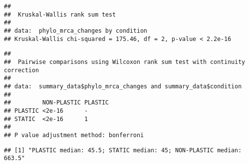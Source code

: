 \documentclass[]{book}
\newenvironment{Shaded}{\begin{snugshade}}{\end{snugshade}}
\newcommand{\DataTypeTok}[1]{\textcolor[rgb]{0.13,0.29,0.53}{#1}}
\newcommand{\KeywordTok}[1]{\textcolor[rgb]{0.13,0.29,0.53}{\textbf{#1}}}
\newcommand{\NormalTok}[1]{#1}
\newcommand{\OperatorTok}[1]{\textcolor[rgb]{0.81,0.36,0.00}{\textbf{#1}}}
\newcommand{\StringTok}[1]{\textcolor[rgb]{0.31,0.60,0.02}{#1}}
\begin{document}
\begin{verbatim}
## 
##  Kruskal-Wallis rank sum test
## 
## data:  phylo_mrca_changes by condition
## Kruskal-Wallis chi-squared = 175.46, df = 2, p-value < 2.2e-16
\end{verbatim}

\begin{Shaded}
\end{Shaded}

\begin{verbatim}
## 
##  Pairwise comparisons using Wilcoxon rank sum test with continuity correction 
## 
## data:  summary_data$phylo_mrca_changes and summary_data$condition 
## 
##         NON-PLASTIC PLASTIC
## PLASTIC <2e-16      -      
## STATIC  <2e-16      1      
## 
## P value adjustment method: bonferroni
\end{verbatim}

\begin{Shaded}
\end{Shaded}

\begin{verbatim}
## [1] "PLASTIC median: 45.5; STATIC median: 45; NON-PLASTIC median: 663.5"
\end{verbatim}
\end{document}
